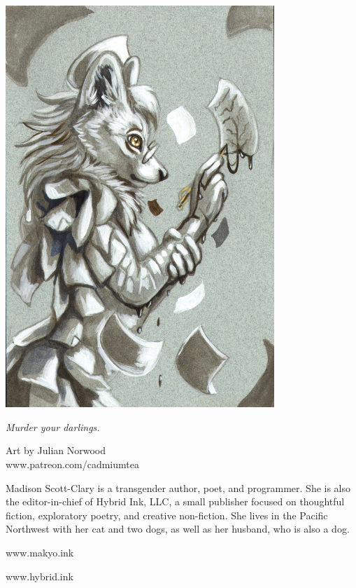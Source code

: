 \begin{paracol}{2}
\begin{leftcolumn}
\includegraphics[width=4in]{assets/cadmiumtea--MurderYourDarlings--makyo--G.jpg}
\begin{flushright}
{\footnotesize
{\allyFont \emph{Murder your darlings.}}

Art by Julian Norwood\\
www.patreon.com/cadmiumtea}
\end{flushright}
\end{leftcolumn}
\begin{rightcolumn}
    \null
    \vfill
\noindent Madison Scott-Clary is a transgender \mbox{author}, poet, and programmer. She is also the editor-in-chief of Hybrid Ink, LLC, a small publisher focused on thoughtful fiction, exploratory poetry, and creative non-fiction. She lives in the Pacific Northwest with her cat and two dogs, as well as her husband, who is also a dog.


\begin{center}
    www.makyo.ink

    www.hybrid.ink
\end{center}
\vfill
\newpage
\end{rightcolumn}
\end{paracol}

\printindex
